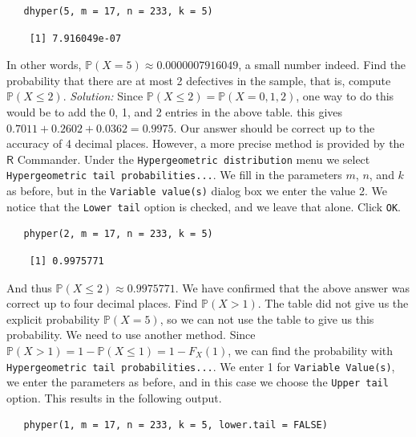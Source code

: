 \documentclass[captions=tableheading]{scrbook}
\begin{document}
\begin{example}
\lstset{language=R}
\begin{lstlisting}
   dhyper(5, m = 17, n = 233, k = 5)
\end{lstlisting}

\begin{verbatim}
    [1] 7.916049e-07
\end{verbatim}

   In other words, \(\mathbb{P}(X=5)\approx0.0000007916049\), a small number indeed.
Find the probability that there are at most 2 defectives in the sample, that is, compute \(\mathbb{P}(X\leq2)\).
   \emph{Solution:} Since \(\mathbb{P}(X\leq2)=\mathbb{P}(X=0,1,2)\), one way to do this would be to add the 0, 1, and 2 entries in the above table. this gives \(0.7011+0.2602+0.0362=0.9975\). Our answer should be correct up to the accuracy of 4 decimal places. However, a more precise method is provided by the \(\mathsf{R}\) Commander. Under the \texttt{Hypergeometric distribution} menu we select \texttt{Hypergeometric tail probabilities...}. We fill in the parameters \(m\), \(n\), and \(k\) as before, but in the \texttt{Variable value(s)} dialog box we enter the value 2. We notice that the \texttt{Lower tail} option is checked, and we leave that alone. Click \texttt{OK}.


\lstset{language=R}
\begin{lstlisting}
   phyper(2, m = 17, n = 233, k = 5)
\end{lstlisting}

\begin{verbatim}
    [1] 0.9975771
\end{verbatim}

   And thus \(\mathbb{P}(X\leq2)\approx 0.9975771\). We have confirmed that the above answer was correct up to four decimal places.
Find \(\mathbb{P}(X>1)\). 
   The table did not give us the explicit probability \(\mathbb{P}(X=5)\), so we can not use the table to give us this probability. We need to use another method. Since \(\mathbb{P}(X>1)=1-\mathbb{P}(X\leq1)=1-F_{X}(1)\), we can find the probability with \texttt{Hypergeometric tail probabilities...}. We enter 1 for \texttt{Variable Value(s)}, we enter the parameters as before, and in this case we choose the \texttt{Upper tail} option. This results in the following output.


\lstset{language=R}
\begin{lstlisting}
   phyper(1, m = 17, n = 233, k = 5, lower.tail = FALSE)
\end{lstlisting}


\end{example}
\end{document}
